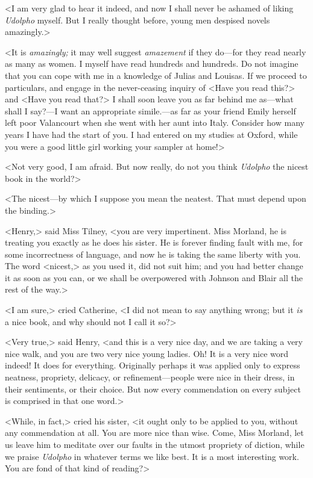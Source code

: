  <I am very glad to hear it indeed, and now I shall never be ashamed of liking \textit{Udolpho} myself. But I really thought before, young men despised novels amazingly.> 

 <It is \textit{amazingly;} it may well suggest \textit{amazement} if they do—for they read nearly as many as women. I myself have read hundreds and hundreds. Do not imagine that you can cope with me in a knowledge of Julias and Louisas. If we proceed to particulars, and engage in the never-ceasing inquiry of <Have you read this?> and <Have you read that?> I shall soon leave you as far behind me as—what shall I say?—I want an appropriate simile.—as far as your friend Emily herself left poor Valancourt when she went with her aunt into Italy. Consider how many years I have had the start of you. I had entered on my studies at Oxford, while you were a good little girl working your sampler at home!> 

 <Not very good, I am afraid. But now really, do not you think \textit{Udolpho} the nicest book in the world?> 

 <The nicest—by which I suppose you mean the neatest. That must depend upon the binding.> 

 <Henry,> said Miss Tilney, <you are very impertinent. Miss Morland, he is treating you exactly as he does his sister. He is forever finding fault with me, for some incorrectness of language, and now he is taking the same liberty with you. The word <nicest,> as you used it, did not suit him; and you had better change it as soon as you can, or we shall be overpowered with Johnson and Blair all the rest of the way.> 

 <I am sure,> cried Catherine, <I did not mean to say anything wrong; but it \textit{is} a nice book, and why should not I call it so?> 

 <Very true,> said Henry, <and this is a very nice day, and we are taking a very nice walk, and you are two very nice young ladies. Oh! It is a very nice word indeed! It does for everything. Originally perhaps it was applied only to express neatness, propriety, delicacy, or refinement—people were nice in their dress, in their sentiments, or their choice. But now every commendation on every subject is comprised in that one word.> 

 <While, in fact,> cried his sister, <it ought only to be applied to you, without any commendation at all. You are more nice than wise. Come, Miss Morland, let us leave him to meditate over our faults in the utmost propriety of diction, while we praise \textit{Udolpho} in whatever terms we like best. It is a most interesting work. You are fond of that kind of reading?> 

